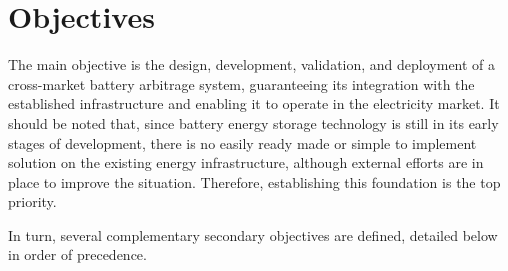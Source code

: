 \section*{Objectives}%
\label{makereference9.1}

The main objective is the design, development, validation, and deployment of a cross-market battery arbitrage system, guaranteeing its integration with the established infrastructure and enabling it to operate in the electricity market. It should be noted that, since battery energy storage technology is still in its early stages of development, there is no easily ready made or simple to implement solution on the existing energy infrastructure, although external efforts are in place to improve the situation. Therefore, establishing this foundation is the top priority.

In turn, several complementary secondary objectives are defined, detailed below in order of precedence.

